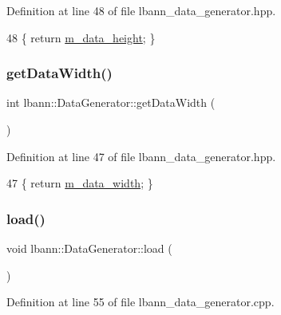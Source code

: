 Definition at line 48 of file lbann\+\_\+data\+\_\+generator.\+hpp.


\begin{DoxyCode}
48 \{ \textcolor{keywordflow}{return} \hyperlink{classlbann_1_1DataGenerator_a676e679d18eb0523be714345205c662d}{m\_data\_height}; \}
\end{DoxyCode}
\mbox{\label{classlbann_1_1DataGenerator_a9ba8ec1349a7a7f7248f56d3263ba62c}} 
\subsubsection{\texorpdfstring{get\+Data\+Width()}{getDataWidth()}}
{\footnotesize\ttfamily int lbann\+::\+Data\+Generator\+::get\+Data\+Width (\begin{DoxyParamCaption}{ }\end{DoxyParamCaption})\hspace{0.3cm}{\ttfamily [inline]}}



Definition at line 47 of file lbann\+\_\+data\+\_\+generator.\+hpp.


\begin{DoxyCode}
47 \{ \textcolor{keywordflow}{return} \hyperlink{classlbann_1_1DataGenerator_a054cb6ab0d93ec57419a81734ddf04aa}{m\_data\_width}; \}
\end{DoxyCode}
\mbox{\label{classlbann_1_1DataGenerator_a8248cc6ea186c23147887ca83b1c4bd7}} 
\subsubsection{\texorpdfstring{load()}{load()}}
{\footnotesize\ttfamily void lbann\+::\+Data\+Generator\+::load (\begin{DoxyParamCaption}{ }\end{DoxyParamCaption})}



Definition at line 55 of file lbann\+\_\+data\+\_\+generator.\+cpp.


